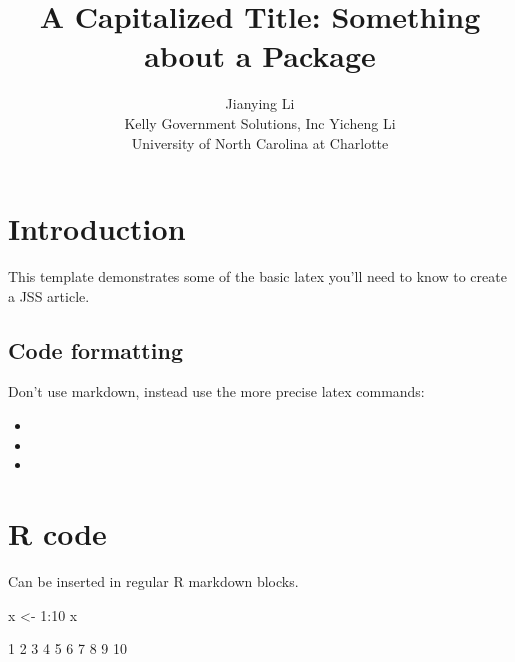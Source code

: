 \documentclass[article]{jss}
\author{
Jianying Li\\Kelly Government Solutions, Inc \And Yicheng Li\\University of North Carolina at Charlotte
}
\title{A Capitalized Title: Something about a Package \pkg{foo}}
\providecommand{\tightlist}{%
  \setlength{\itemsep}{0pt}\setlength{\parskip}{0pt}}
\begin{document}
\section{Introduction}\label{introduction}

This template demonstrates some of the basic latex you'll need to know
to create a JSS article.

\subsection{Code formatting}\label{code-formatting}

Don't use markdown, instead use the more precise latex commands:

\begin{itemize}
\tightlist
\item
\item
\item
\end{itemize}

\section{R code}\label{r-code}

Can be inserted in regular R markdown blocks.

\begin{CodeChunk}
\begin{CodeInput}
x <- 1:10
x
\end{CodeInput}
\begin{CodeOutput}
 [1]  1  2  3  4  5  6  7  8  9 10
\end{CodeOutput}
\end{CodeChunk}
\end{document}
